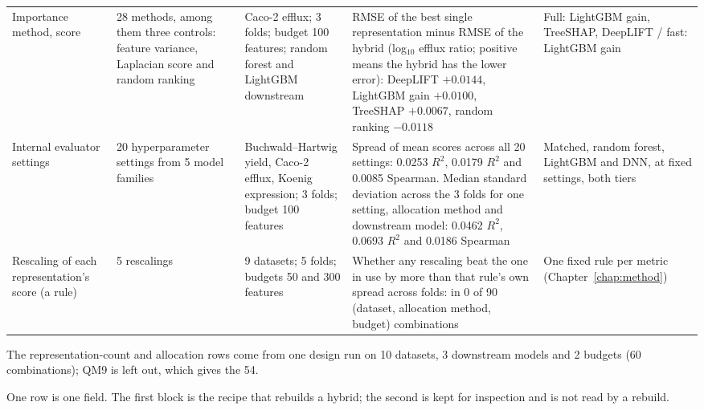 {\begin{longtable}{@{}p{1.9cm}p{2.5cm}p{2.7cm}p{4.4cm}p{2.5cm}@{}}
\addlinespace
Importance method, score & 28 methods, among them three controls: feature variance, Laplacian score and random ranking & Caco-2 efflux; 3 folds; budget 100 features; random forest and LightGBM downstream & RMSE of the best single representation minus RMSE of the hybrid (log$_{10}$ efflux ratio; positive means the hybrid has the lower error): DeepLIFT $+0.0144$, LightGBM gain $+0.0100$, TreeSHAP $+0.0067$, random ranking $-0.0118$ & Full: LightGBM gain, TreeSHAP, DeepLIFT / fast: LightGBM gain \\
\addlinespace
Internal evaluator settings & 20 hyperparameter settings from 5 model families & Buchwald--Hartwig yield, Caco-2 efflux, Koenig expression; 3 folds; budget 100 features & Spread of mean scores across all 20 settings: 0.0253 $R^2$, 0.0179 $R^2$ and 0.0085 Spearman. Median standard deviation across the 3 folds for one setting, allocation method and downstream model: 0.0462 $R^2$, 0.0693 $R^2$ and 0.0186 Spearman & Matched, random forest, LightGBM and DNN, at fixed settings, both tiers \\
\addlinespace
Rescaling of each representation's score (a rule) & 5 rescalings & 9 datasets; 5 folds; budgets 50 and 300 features & Whether any rescaling beat the one in use by more than that rule's own spread across folds: in 0 of 90 (dataset, allocation method, budget) combinations & One fixed rule per metric (Chapter~\ref{chap:method}) \\
\bottomrule
\end{longtable}
{\footnotesize The representation-count and allocation rows come from one design run on 10 datasets, 3 downstream models and 2 budgets (60 combinations); QM9 is left out, which gives the 54.}
}

\label{app:add:blueprint_fields}
One row is one field. The first block is the recipe that rebuilds a hybrid; the second is kept for inspection and is not read by a rebuild.

